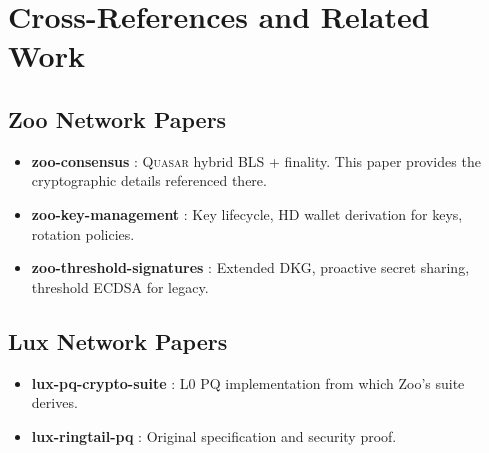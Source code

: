 \section{Cross-References and Related Work}


\subsection{Zoo Network Papers}

\begin{itemize}
\item \textbf{zoo-consensus} \cite{zoo-consensus}: \textsc{Quasar} hybrid BLS + \Ringtail{} finality. This paper provides the cryptographic details referenced there.
\item \textbf{zoo-key-management} \cite{zoo-key-mgmt}: Key lifecycle, HD wallet derivation for \MLDSA{} keys, rotation policies.
\item \textbf{zoo-threshold-signatures} \cite{zoo-threshold-sigs}: Extended \Ringtail{} DKG, proactive secret sharing, threshold ECDSA for legacy.
\end{itemize}

\subsection{Lux Network Papers}

\begin{itemize}
\item \textbf{lux-pq-crypto-suite} \cite{lux-pq-crypto}: \Lux{} L0 PQ implementation from which Zoo's suite derives.
\item \textbf{lux-ringtail-pq} \cite{lux-ringtail-pq}: Original \Ringtail{} specification and security proof.
\end{itemize}

